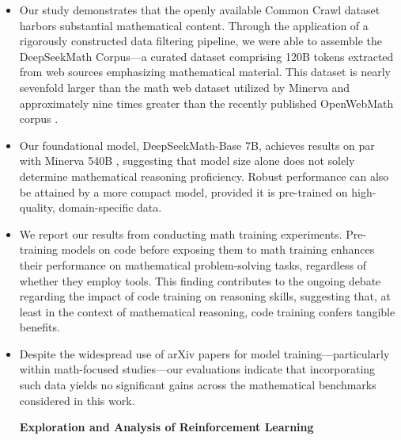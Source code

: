 \begin{itemize}[topsep=0pt]
    \item Our study demonstrates that the openly available Common Crawl dataset harbors substantial mathematical content. Through the application of a rigorously constructed data filtering pipeline, we were able to assemble the DeepSeekMath Corpus—a curated dataset comprising 120B tokens extracted from web sources emphasizing mathematical material. This dataset is nearly sevenfold larger than the math web dataset utilized by Minerva \citep{minerva} and approximately nine times greater than the recently published OpenWebMath corpus \citep{openwebmath}.

    \item Our foundational model, DeepSeekMath-Base 7B, achieves results on par with Minerva 540B \citep{minerva}, suggesting that model size alone does not solely determine mathematical reasoning proficiency. Robust performance can also be attained by a more compact model, provided it is pre-trained on high-quality, domain-specific data.

\item We report our results from conducting math training experiments. Pre-training models on code before exposing them to math training enhances their performance on mathematical problem-solving tasks, regardless of whether they employ tools. This finding contributes to the ongoing debate regarding the impact of code training on reasoning skills, suggesting that, at least in the context of mathematical reasoning, code training confers tangible benefits.

\item Despite the widespread use of arXiv papers for model training—particularly within math-focused studies—our evaluations indicate that incorporating such data yields no significant gains across the mathematical benchmarks considered in this work.

\textbf{Exploration and Analysis of Reinforcement Learning}


\end{itemize}
